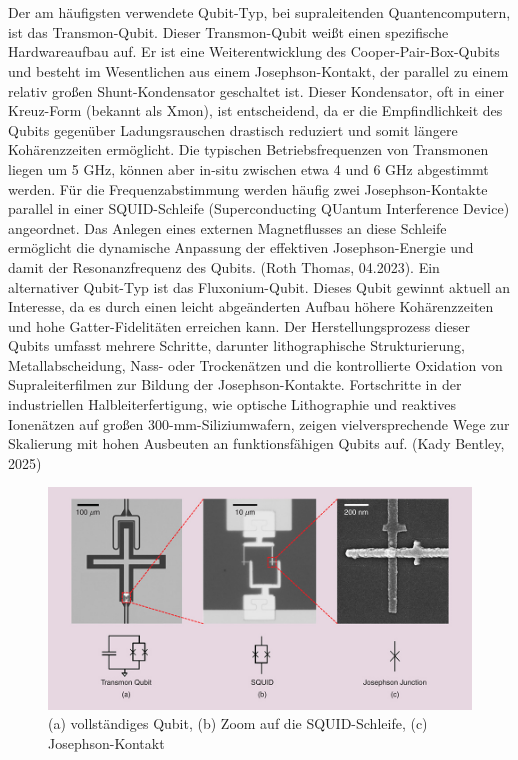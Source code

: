 \\\\
Der am häufigsten verwendete Qubit-Typ, bei supraleitenden Quantencomputern, ist das Transmon-Qubit. Dieser Transmon-Qubit weißt einen spezifische Hardwareaufbau auf. Er ist eine Weiterentwicklung des Cooper-Pair-Box-Qubits und besteht im Wesentlichen aus einem Josephson-Kontakt, der parallel zu einem relativ großen Shunt-Kondensator geschaltet ist. Dieser Kondensator, oft in einer \glqq Kreuz\grqq{}-Form (bekannt als Xmon), ist entscheidend, da er die Empfindlichkeit des Qubits gegenüber Ladungsrauschen drastisch reduziert und somit längere Kohärenzzeiten ermöglicht. Die typischen Betriebsfrequenzen von Transmonen liegen um 5 GHz, können aber in-situ zwischen etwa 4 und 6 GHz abgestimmt werden. Für die Frequenzabstimmung werden häufig zwei Josephson-Kontakte parallel in einer SQUID-Schleife (Superconducting QUantum Interference Device) angeordnet. Das Anlegen eines externen Magnetflusses an diese Schleife ermöglicht die dynamische Anpassung der effektiven Josephson-Energie und damit der Resonanzfrequenz des Qubits. (Roth Thomas, 04.2023). Ein alternativer Qubit-Typ ist das Fluxonium-Qubit. Dieses Qubit gewinnt aktuell an Interesse, da es durch einen leicht abgeänderten Aufbau höhere Kohärenzzeiten und hohe Gatter-Fidelitäten erreichen kann. Der Herstellungsprozess dieser Qubits umfasst mehrere Schritte, darunter lithographische Strukturierung, Metallabscheidung, Nass- oder Trockenätzen und die kontrollierte Oxidation von Supraleiterfilmen zur Bildung der Josephson-Kontakte. Fortschritte in der industriellen Halbleiterfertigung, wie optische Lithographie und reaktives Ionenätzen auf großen 300-mm-Siliziumwafern, zeigen vielversprechende Wege zur Skalierung mit hohen Ausbeuten an funktionsfähigen Qubits auf. (Kady Bentley, 2025)

\begin{figure}[ht]
    \centering
    \includegraphics[width=1\textwidth]{images/quanten-hardware/Transmon Qubit.jpg}
    \caption{(a) vollständiges Qubit, (b) Zoom auf die SQUID-Schleife, (c) Josephson-Kontakt}
    \label{fig:transom_image}
    \end{figure}

